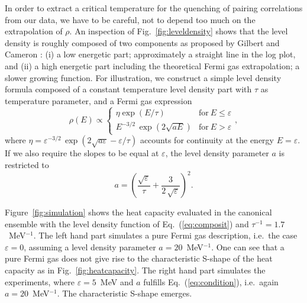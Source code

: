 


In order to extract a critical temperature for the quenching of pairing 
correlations from our data, we have to be careful, not to depend too much on 
the extrapolation of $\rho$. An inspection of Fig.~\ref{fig:leveldensity} shows
that the level density is roughly composed of two components as proposed by 
Gilbert and Cameron \cite{GC65}: (i) a low energetic part; approximately a 
straight line in the log plot, and (ii) a high energetic part including the 
theoretical Fermi gas extrapolation; a slower growing function. For 
illustration, we construct a simple level density formula composed of a 
constant temperature level density part with $\tau$ as temperature parameter, 
and a Fermi gas expression 
\begin{equation}
\rho(E)\propto\left\{\begin{array}{cc}\eta\exp(E/\tau)&{\mathrm{for}}\ E\leq
\varepsilon\\
E^{-3/2}\,\exp(2\sqrt{aE})&{\mathrm{for}}\ E>\varepsilon
\end{array}\right.,
\label{eq:composit}
\end{equation}
where $\eta=\varepsilon^{-3/2}\,\exp(2\sqrt{a\varepsilon}-\varepsilon/\tau)$ 
accounts for continuity at the energy $E=\varepsilon$. If we also require the 
slopes to be equal at $\varepsilon$, the level density parameter $a$ is 
restricted to
\begin{equation}
a=\left(\frac{\sqrt{\varepsilon}}{\tau}+\frac{3}{2\,\sqrt{\varepsilon}}
\right)^2.
\label{eq:condition}
\end{equation}

Figure~\ref{fig:simulation} shows the heat capacity evaluated in the canonical 
ensemble with the level density function of Eq.~(\ref{eq:composit}) and 
$\tau^{-1}=1.7$~MeV$^{-1}$. The left hand part simulates a pure Fermi gas 
description, i.e.\ the case $\varepsilon=0$, assuming a level density parameter
$a=20$~MeV$^{-1}$. One can see that a pure Fermi gas does not give rise to the 
characteristic S-shape of the heat capacity as in Fig.~\ref{fig:heatcapacity}.
The right hand part simulates the experiments, where $\varepsilon=5$~MeV and 
$a$ fulfills Eq.~(\ref{eq:condition}), i.e.\ again $a=20$~MeV$^{-1}$. The 
characteristic S-shape emerges. 


